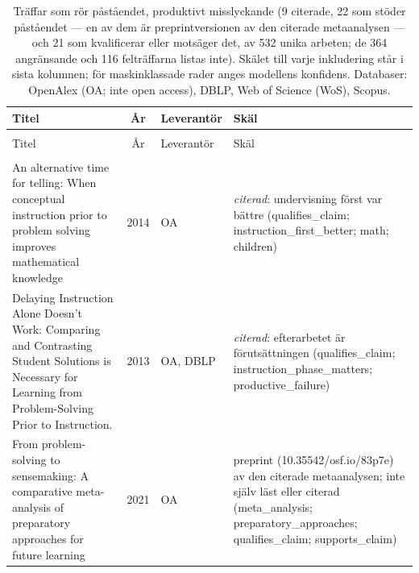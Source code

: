
\begingroup\footnotesize
\begin{longtable}{@{}%
  >{\raggedright\arraybackslash}p{}c%
  >{\raggedright\arraybackslash}p{}%
  >{\raggedright\arraybackslash\footnotesize}p{}@{}}
\caption{Träffar som rör påståendet, produktivt misslyckande (9 citerade, 22 som stöder påståendet --- en av dem är preprintversionen av den citerade metaanalysen --- och 21 som kvalificerar eller motsäger det, av 532 unika arbeten; de 364 angränsande och 116 felträffarna listas inte). Skälet till varje inkludering står i sista kolumnen; för maskinklassade rader anges modellens konfidens. Databaser: OpenAlex (OA; inte open access), DBLP, Web of Science (WoS), Scopus.}\label{tab:sok-pf}\\
\toprule
Titel & År & Leverantör & Skäl \\
\midrule
\endfirsthead
\multicolumn{4}{@{}l}{\emph{\tablename~\thetable{} (forts.)}}\\
\toprule
Titel & År & Leverantör & Skäl \\
\midrule
\endhead
\midrule \multicolumn{4}{r@{}}{\emph{forts.\ på nästa sida}}\\
\endfoot
\bottomrule
\endlastfoot
An alternative time for telling: When conceptual instruction prior to problem solving improves mathematical knowledge & 2014 & OA & \emph{citerad}: undervisning först var bättre (qualifies\_\allowbreak{}claim; instruction\_\allowbreak{}first\_\allowbreak{}better; math; children) \\
Delaying Instruction Alone Doesn't Work: Comparing and Contrasting Student Solutions is Necessary for Learning from Problem-Solving Prior to Instruction. & 2013 & OA, DBLP & \emph{citerad}: efterarbetet är förutsättningen (qualifies\_\allowbreak{}claim; instruction\_\allowbreak{}phase\_\allowbreak{}matters; productive\_\allowbreak{}failure) \\
From problem-solving to sensemaking: A comparative meta-analysis of preparatory approaches for future learning & 2021 & OA & preprint (10.35542/osf.io/83p7e) av den citerade metaanalysen; inte själv läst eller citerad (meta\_\allowbreak{}analysis; preparatory\_\allowbreak{}approaches; qualifies\_\allowbreak{}claim; supports\_\allowbreak{}claim) \\

\end{longtable}
